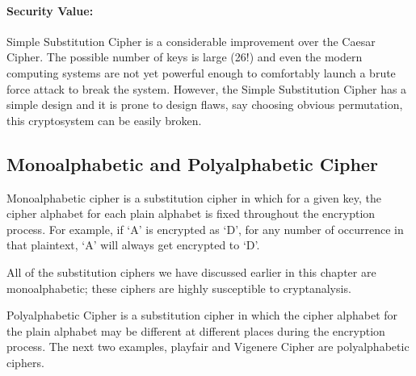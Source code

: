 \documentclass[british]{article}
\begin{document}
\paragraph*{Security Value:}

Simple Substitution Cipher is a considerable improvement over the
Caesar Cipher. The possible number of keys is large (26!) and even
the modern computing systems are not yet powerful enough to comfortably
launch a brute force attack to break the system. However, the Simple
Substitution Cipher has a simple design and it is prone to design
flaws, say choosing obvious permutation, this cryptosystem can be
easily broken.

\subsection{Monoalphabetic and Polyalphabetic Cipher}

Monoalphabetic cipher is a substitution cipher in which for a given
key, the cipher alphabet for each plain alphabet is fixed throughout
the encryption process. For example, if \textquoteleft A\textquoteright{}
is encrypted as \textquoteleft D\textquoteright , for any number of
occurrence in that plaintext, \textquoteleft A\textquoteright{} will
always get encrypted to \textquoteleft D\textquoteright .

All of the substitution ciphers we have discussed earlier in this
chapter are monoalphabetic; these ciphers are highly susceptible to
cryptanalysis.

Polyalphabetic Cipher is a substitution cipher in which the cipher
alphabet for the plain alphabet may be different at different places
during the encryption process. The next two examples, playfair and
Vigenere Cipher are polyalphabetic ciphers.
\end{document}
